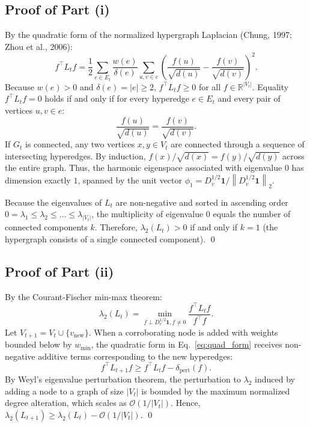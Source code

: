 \documentclass[11pt]{article}
\newcommand{\R}{\mathbb{R}}
\newcommand{\norm}[1]{\left\lVert#1\right\rVert}
\begin{document}
\subsection{Proof of Part (i)}
By the quadratic form of the normalized hypergraph Laplacian (Chung, 1997; Zhou et al., 2006):
\begin{equation}
  f^\top L_t f = \frac{1}{2} \sum_{e \in E_t} \frac{w(e)}{\delta(e)} \sum_{u, v \in e} \left( \frac{f(u)}{\sqrt{d(u)}} - \frac{f(v)}{\sqrt{d(v)}} \right)^2.
  \label{eq:quad_form}
\end{equation}
Because $w(e) > 0$ and $\delta(e) = |e| \ge 2$, $f^\top L_t f \ge 0$ for all $f \in \R^{|V_t|}$.
Equality $f^\top L_t f = 0$ holds if and only if for every hyperedge $e \in E_t$ and every pair of vertices $u, v \in e$:
\begin{equation}
  \frac{f(u)}{\sqrt{d(u)}} = \frac{f(v)}{\sqrt{d(v)}}.
\end{equation}
If $G_t$ is connected, any two vertices $x, y \in V_t$ are connected through a sequence of intersecting hyperedges. By induction, $f(x)/\sqrt{d(x)} = f(y)/\sqrt{d(y)}$ across the entire graph. Thus, the harmonic eigenspace associated with eigenvalue $0$ has dimension exactly $1$, spanned by the unit vector $\phi_1 = D_v^{1/2} \mathbf{1} / \norm{D_v^{1/2} \mathbf{1}}_2$.

Because the eigenvalues of $L_t$ are non-negative and sorted in ascending order $0 = \lambda_1 \le \lambda_2 \le \dots \le \lambda_{|V_t|}$, the multiplicity of eigenvalue $0$ equals the number of connected components $k$. Therefore, $\lambda_2(L_t) > 0$ if and only if $k = 1$ (the hypergraph consists of a single connected component). \qed

\subsection{Proof of Part (ii)}
By the Courant-Fischer min-max theorem:
\begin{equation}
  \lambda_2(L_t) = \min_{f \perp D_v^{1/2}\mathbf{1}, f \ne 0} \frac{f^\top L_t f}{f^\top f}.
  \label{eq:courant_fischer_s}
\end{equation}
Let $V_{t+1} = V_t \cup \{v_{\text{new}}\}$. When a corroborating node is added with weights bounded below by $w_{\min}$, the quadratic form in Eq.~\eqref{eq:quad_form} receives non-negative additive terms corresponding to the new hyperedges:
\begin{equation}
  f^\top L_{t+1} f \ge f^\top L_t f - \delta_{\text{pert}}(f).
\end{equation}
By Weyl's eigenvalue perturbation theorem, the perturbation to $\lambda_2$ induced by adding a node to a graph of size $|V_t|$ is bounded by the maximum normalized degree alteration, which scales as $\mathcal{O}(1/|V_t|)$. Hence, $\lambda_2(L_{t+1}) \ge \lambda_2(L_t) - \mathcal{O}(1/|V_t|)$. \qed
\end{document}
